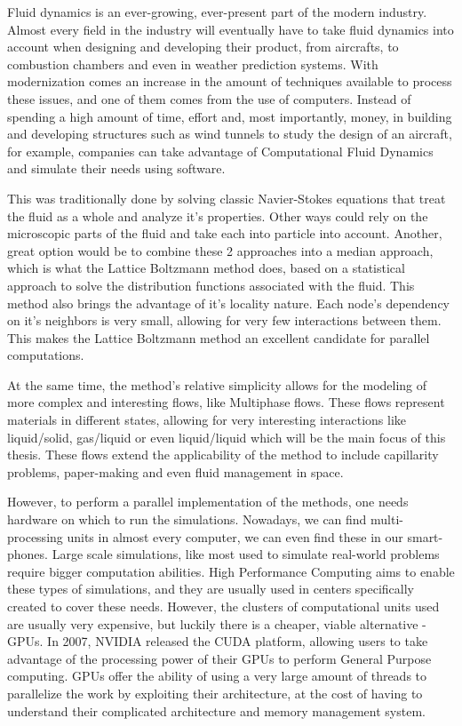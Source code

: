 \documentclass[12pt, openany]{book}
\begin{document}
Fluid dynamics is an ever-growing, ever-present part of the modern industry. Almost every field in the industry will eventually have to take fluid dynamics into account when designing and developing their product, from aircrafts, to combustion chambers and even in weather prediction systems. With modernization comes an increase in the amount of techniques available to process these issues, and one of them comes from the use of computers. Instead of spending a high amount of time, effort and, most importantly, money, in building and developing structures such as wind tunnels to study the design of an aircraft, for example, companies can take advantage of Computational Fluid Dynamics and simulate their needs using software. \par
This was traditionally done by solving classic Navier-Stokes equations that treat the fluid as a whole and analyze it's properties. Other ways could rely on the microscopic parts of the fluid and take each into particle into account. Another, great option would be to combine these 2 approaches into a median approach, which is what the Lattice Boltzmann method does, based on a statistical approach to solve the distribution functions associated with the fluid. This method also brings the advantage of it's locality nature. Each node's dependency on it's neighbors is very small, allowing for very few interactions between them. This makes the Lattice Boltzmann method an excellent candidate for parallel computations.\par
At the same time, the method's relative simplicity allows for the modeling of more complex and interesting flows, like Multiphase flows. These flows represent materials in different states, allowing for very interesting interactions like liquid/solid, gas/liquid or even liquid/liquid which will be the main focus of this thesis. These flows extend the applicability of the method to include capillarity problems, paper-making and even fluid management in space. \par
However, to perform a parallel implementation of the methods, one needs hardware on which to run the simulations. Nowadays, we can find multi-processing units in almost every computer, we can even find these in our smart-phones. Large scale simulations, like most used to simulate real-world problems require bigger computation abilities. High Performance Computing aims to enable these types of simulations, and they are usually used in centers specifically created to cover these needs. However, the clusters of computational units used are usually very expensive, but luckily there is a cheaper, viable alternative - GPUs. In 2007, NVIDIA released the CUDA platform, allowing users to take advantage of the processing power of their GPUs to perform General Purpose computing. GPUs offer the ability of using a very large amount of threads to parallelize the work by exploiting their architecture, at the cost of having to understand their complicated architecture and memory management system. \par
\end{document}
